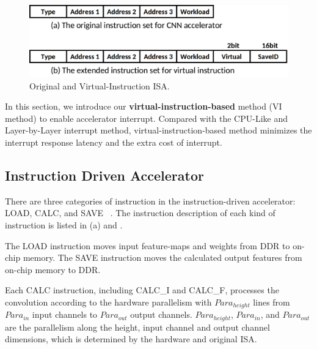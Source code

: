 \begin{figure}[t]
	\centering
	\includegraphics[width=0.99\linewidth]{fig/instructions.png}
	\caption{Original and Virtual-Instruction ISA.}
	\label{fig:instructions}
\end{figure}

In this section, we introduce our \textbf{virtual-instruction-based} method (VI method) to enable accelerator interrupt. Compared with the CPU-Like and Layer-by-Layer interrupt method, virtual-instruction-based method minimizes the interrupt response latency and the extra cost of interrupt.

\subsection{ Instruction Driven Accelerator }
\label{sec:instrAcc}
There are three categories of instruction in the instruction-driven accelerator: LOAD, CALC, and SAVE  ~\cite{guo2017angel,qiu2016going,yu2018instruction}. The instruction description of each kind of instruction is listed in (a) and .

The LOAD instruction moves input feature-maps and weights from DDR to on-chip memory. The SAVE instruction moves the calculated output features from on-chip memory to DDR. 

Each CALC  instruction,  including CALC\_I and CALC\_F, processes the convolution according to the hardware parallelism with $Para_{height}$ lines from $ Para_{in} $ input channels to $ Para_{out}$ output channels. $Para_{height}$, $ Para_{in} $, and $ Para_{out} $ are the parallelism along the height, input channel and output channel dimensions, which is determined by the hardware and original ISA.

